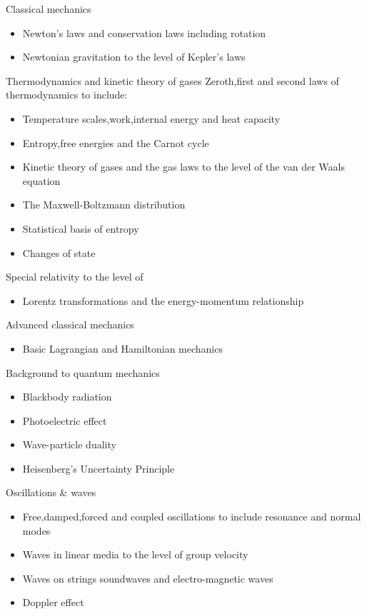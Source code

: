\documentclass[a4paper, oneside, 12pt]{memoir}
\begin{document}
Classical mechanics
\begin{itemize}
    \item Newton’s laws and conservation laws including rotation
    \item Newtonian gravitation to the level of Kepler’s laws
\end{itemize}
Thermodynamics and kinetic theory of gases
Zeroth,first and second laws of thermodynamics to include:
\begin{itemize}
    \item Temperature scales,work,internal energy and heat capacity
    \item Entropy,free energies and the Carnot cycle
    \item Kinetic theory of gases and the gas laws to the level of the van der Waals equation
    \item The Maxwell-Boltzmann distribution
    \item Statistical basis of entropy
    \item Changes of state
\end{itemize}
Special relativity
to the level of
\begin{itemize}
    \item Lorentz transformations and the energy-momentum relationship
\end{itemize}
Advanced classical mechanics
\begin{itemize}
    \item Basic Lagrangian and Hamiltonian mechanics
\end{itemize}
Background to quantum mechanics
\begin{itemize}
    \item Blackbody radiation
    \item Photoelectric effect
    \item Wave-particle duality
    \item Heisenberg’s Uncertainty Principle
\end{itemize}
Oscillations & waves
\begin{itemize}
    \item Free,damped,forced and coupled oscillations to include resonance and normal modes
    \item Waves in linear media to the level of group velocity
    \item Waves on strings soundwaves and electro-magnetic waves
    \item Doppler effect
\end{itemize}
\end{document}
